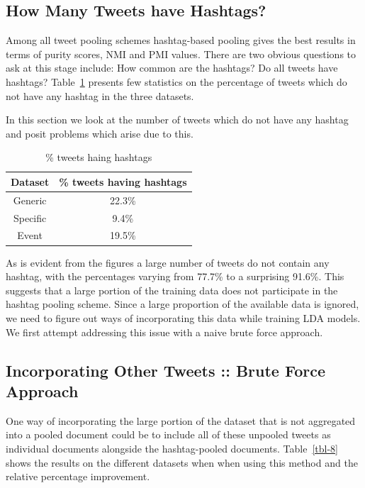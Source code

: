 \documentclass[10pt,a5paper,twoside]{article}
\begin{document}
\subsection{How Many Tweets have Hashtags?}

Among all tweet pooling schemes hashtag-based pooling gives the best
results in terms of purity scores, NMI and PMI values. There are two
obvious questions to ask at this stage include: How common are the
hashtags? Do all tweets have hashtags? Table~\ref{tbl-7} presents few
statistics on the percentage of tweets which do not have any hashtag
in the three datasets.

In this section we look at the number of tweets which do not have any
hashtag and posit problems which arise due to this.

\begin{table}[!h]
\centering
	\begin{tabular}{|c|c|}
	\hline
	Dataset & \% tweets having hashtags\\
	\hline
	Generic & 22.3\%\\
	\hline
	Specific & 9.4\% \\
	\hline
	Event & 19.5\% \\
	\hline
	\end{tabular}
\caption{\% tweets haing hashtags}\label{tbl-7}
\end{table}

As is evident from the figures a large number of tweets do not contain
any hashtag, with the percentages varying from 77.7\% to a surprising
91.6\%. This suggests that a large portion of the training data does
not participate in the hashtag pooling scheme. Since a large proportion
of the available data is ignored, we need to figure out ways of
incorporating this data while training LDA models.  We first attempt addressing
this issue with a naive brute force approach.

\subsection{Incorporating Other Tweets :: Brute Force Approach}

One way of incorporating the large portion of the dataset that is not
aggregated into a pooled document could be to include all of these
unpooled tweets as individual documents alongside the hashtag-pooled
documents.  Table~\ref{tbl-8} shows the results on the different datasets when
when using this method and the relative percentage improvement.
\end{document}
